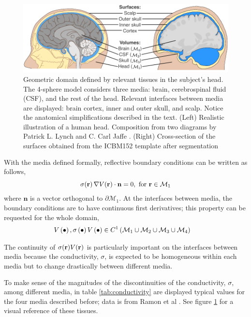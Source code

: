 \begin{figure}
\centering
\includegraphics[width=\linewidth]{./img/HeadSurfacesVolumes}
\caption{Geometric domain defined by relevant tissues in the subject's head. The 4-sphere model considers three media: brain, cerebrospinal fluid (CSF), and the rest of the head. Relevant interfaces between media are displayed: brain cortex, inner and outer skull, and scalp. Notice the anatomical simplifications described in the text. (Left) Realistic illustration of a human head. Composition from two diagrams by Patrick L. Lynch and C. Carl Jaffe \cite{wikipic1, wikipic2}.  (Right) Cross-section of the surfaces obtained from the ICBM152 template after segmentation}
\label{fig:diagrams2}
\end{figure}

With the media defined formally, reflective boundary conditions can be written as follows,
\begin{equation}
\sigma(\mathbf{r})\, \nabla V(\mathbf{r}) \cdot \mathbf{n} = 0, 
\text{ for } \mathbf{r} \in \mathcal{M}_1
\label{eq:boundary1}
\end{equation}
where $\mathbf{n}$ is a vector orthogonal to $\partial\mathcal{M}_1$.
%
At the interfaces between media, the boundary conditions are to have continuous first derivatives; this property can be requested for the whole domain,
\begin{align}
    V\left( \bullet \right), \sigma\left( \bullet \right) V\left( \bullet \right)  
    &\in C^1\left( \mathcal{M}_1 \cup \mathcal{M}_2 \cup \mathcal{M}_3 \cup \mathcal{M}_4  \right)
\end{align}

The continuity of $\sigma(\mathbf{r}) V(\mathbf{r})$ is particularly important on the interfaces between media because the conductivity, $\sigma$, is expected to be homogeneous within each media but to change drastically between different media. 

To make sense of the magnitudes of the discontinuities of the conductivity, $\sigma$, among different media, in table \ref{tab:conductivity} are displayed typical values for the four media described before; data is from Ramon et al \cite{ramon2006influence}. See figure \ref{fig:diagrams2} for a visual reference of these tissues.

